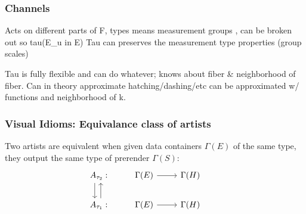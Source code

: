 \documentclass[../main.tex]{subfiles}
\begin{document}
\subsubsection{Channels}
Acts on different parts of F, types means measurement groups , can be broken out so tau(E_{u} in E)
Tau can preserves the measurement type properties (group scales)


Tau is fully flexible and can do whatever; knows about fiber \& neighborhood of fiber. Can in theory approximate hatching/dashing/etc can be approximated w/ functions and neighborhood of k. 


\subsubsection{Visual Idioms: Equivalance class of artists}
Two artists are equivalent when given data containers $\Gamma(E)$ of the same type, they output the same type of prerender $\Gamma(S)$:
\begin{equation}
    \begin{tikzcd}
        A_{\tau_2}: \arrow[d, shift right=2] & \Gamma(E) \arrow[r] & \Gamma(H) &                                                \\
        A_{\tau_1}: \arrow[u, shift right]   & \Gamma(E) \arrow[r] & \Gamma(H) 
    \end{tikzcd}
\end{equation}
\end{document}
